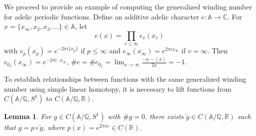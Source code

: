 \documentclass[11pt]{article}
\newtheorem{lemma}[theorem]{Lemma}     %
\newcommand{\A}{\mathbb{A}}
\theoremstyle{remark}
\begin{document}
We proceed to provide an example of computing the generalized winding number for adelic periodic functions.
Define an additive adelic character $e:\A\rightarrow \mathbb{C}$. For \(x=\{x_\infty,x_2,x_3,\dots\}\in \A\), let
\[
e(x)=\prod\limits_{v\leq\infty}e_v(x_v)
\]
with \(e_p(x_p)=e^{-2\pi i\{x_p\}}\) if \(p\leq \infty\) and \(e_{\infty}(x_{\infty})=e^{2\pi ix_{\infty}}\) if \(v=\infty\). Then $e_{0_f}(x_\infty)=e^{-2\pi i\cdot x_{\infty}}$, $\#e=\#e_{0_f}=\lim_{x\rightarrow \infty}\frac{- x-(x)}{2x}=-1.$

To establish relationships between functions with the same generalized winding number using simple linear homotopy, it is necessary to lift functions from \( C(\A/\mathbb{Q}, S^1) \) to \( C(\A/\mathbb{Q},\mathbb{R}) \).
\begin{lemma}\label{adelelift}
     For \( g \in C(\A/\mathbb{Q}, S^1) \) with \( \#g = 0 \), there exists \( \tilde{g} \in C(\A/\mathbb{Q}, \mathbb{R}) \) such that \( g = p \circ \tilde{g} \), where \(p(x)=e^{2\pi ix}\in C(\mathbb{R}).\)
\end{lemma}
\end{document}
